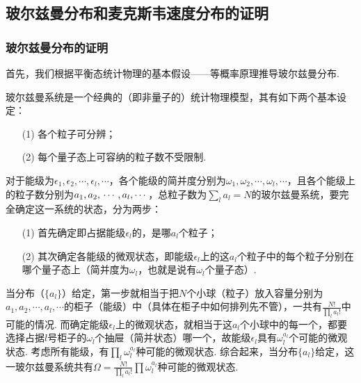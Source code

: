 \documentclass{assignment}
\begin{document}
\subsection{玻尔兹曼分布和麦克斯韦速度分布的证明}

\subsubsection{玻尔兹曼分布的证明}
首先，我们根据平衡态统计物理的基本假设——等概率原理推导玻尔兹曼分布.

玻尔兹曼系统是一个经典的（即非量子的）统计物理模型，其有如下两个基本设定：
\begin{itemize}
    \item[(1)] 各个粒子可分辨；
    \item[(2)] 每个量子态上可容纳的粒子数不受限制.
\end{itemize}

对于能级为$\epsilon_1,\epsilon_2,\cdots,\epsilon_l,\cdots$，各个能级的简并度分别为$\omega_1,\omega_2,\cdots,\omega_l,\cdots$，且各个能级上的粒子数分别为$a_1,a_2,\\\cdots,a_l,\cdots$，总粒子数为$\sum_la_l=N$的玻尔兹曼系统，要完全确定这一系统的状态，分为两步：
\begin{itemize}
    \item[(1)] 首先确定即占据能级$\epsilon_l$的，是哪$a_l$个粒子；
    \item[(2)] 其次确定各能级的微观状态，即能级$\epsilon_l$上的这$a_l$个粒子中的每个粒子分别在哪个量子态上（简并度为$\omega_l$，也就是说有$\omega_l$个量子态）.
\end{itemize}
当分布（$\{a_l\}$）给定，第一步就相当于把$N$个小球（粒子）放入容量分别为$a_1,a_2,\cdots,a_l,\cdots$的柜子（能级）中（具体在柜子中如何排列先不管），一共有$\frac{N!}{\prod_la_l!}$中可能的情况. 而确定能级$\epsilon_l$上的微观状态，就相当于这$a_l$个小球中的每一个，都要选择占据$l$号柜子的$\omega_l$个抽屉（简并状态）哪一个，故能级$\epsilon_l$具有$\omega_l^{a_l}$个可能的微观状态. 考虑所有能级，有$\prod_l\omega_l^{a_l}$种可能的微观状态. 综合起来，当分布$\{a_l\}$给定，这一玻尔兹曼系统共有$\Omega=\frac{N!}{\prod_la_l!}\prod\omega_l^{a_l}$种可能的微观状态.
\end{document}

